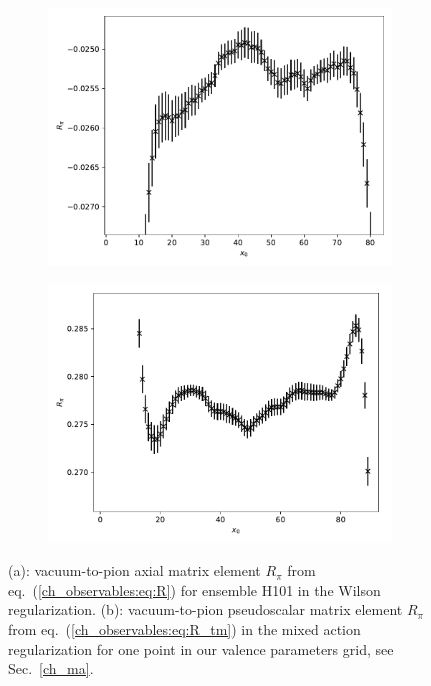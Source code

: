 \begin{figure}
    \centering
    \begin{subfigure}{1.\textwidth}
    	\includegraphics[width=\textwidth]{./cap3/figs/R_H101.pdf}
    	\caption{}
    \end{subfigure}
    \begin{subfigure}{1.\textwidth}
    	\includegraphics[width=\textwidth]{./cap3/figs/R_tm_H101.pdf}
    	\caption{}
    \end{subfigure}
    \caption{(a): vacuum-to-pion axial matrix element $R_{\pi}$ from eq.~(\ref{ch_observables:eq:R}) for ensemble H101 in the Wilson regularization. (b): vacuum-to-pion pseudoscalar matrix element $R_{\pi}$ from eq.~(\ref{ch_observables:eq:R_tm}) in the mixed action regularization for one point in our valence parameters grid, see Sec.~\ref{ch_ma}.}
        \label{ch_observables:fig:R}
\end{figure}

